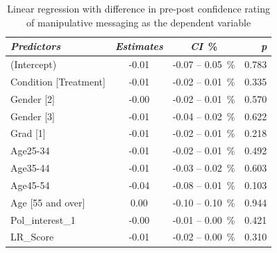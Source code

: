 \documentclass[empirical, authordate, issue]{jote-new-article}
\begin{document}
\begin{table}

  \caption{Linear regression with difference in pre-post confidence rating of manipulative messaging as the dependent variable }
  \label{tab:tableS34}



  \begin{tabularx}{\linewidth}{@{} X  S  S[table-space-text-post=\,\%]<{\,\%}
    r @{}}

    \toprule
    \emph{Predictors}                                    & {\emph{Estimates}}                         & {\emph{\emph{CI}}} & {\emph{p}}     \\
    \midrule
    (Intercept)                                          & -0.01                                      & -0.07 -- 0.05      & 0.783          \\
    Condition [Treatment]                                & -0.01                                      & -0.02 -- 0.01      & 0.335          \\
    Gender [2]                                           & -0.00                                      & -0.02 -- 0.01      & 0.570          \\
    Gender [3]                                           & -0.01                                      & -0.04 -- 0.02      & 0.622          \\
    Grad [1]                                             & -0.01                                      & -0.02 -- 0.01      & 0.218          \\
    Age25-34                                             & -0.01                                      & -0.02 -- 0.01      & 0.492          \\
    Age35-44                                             & -0.01                                      & -0.03 -- 0.02      & 0.603          \\
    Age45-54                                             & -0.04                                      & -0.08 -- 0.01      & 0.103          \\
    Age [55 and over]                                    & 0.00                                       & -0.10 -- 0.10      & 0.944          \\
    Pol\_interest\_1                                     & -0.00                                      & -0.01 -- 0.00      & 0.421          \\
    LR\_Score                                            & -0.01                                      & -0.02 -- 0.00      & 0.310          \\

\end{tabularx}
\end{table}
\end{document}
